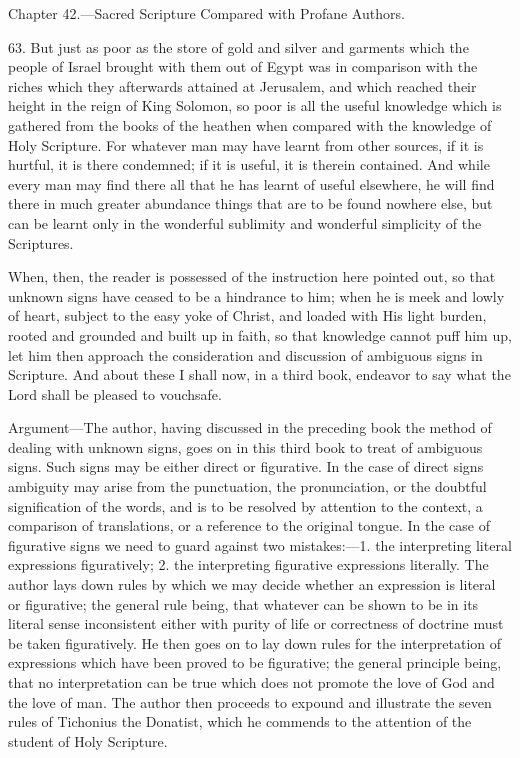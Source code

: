 
Chapter 42.—Sacred Scripture Compared with Profane Authors.

63. But just as poor as the store of gold and silver and garments which the people of Israel brought with them out of Egypt was in comparison with the riches which they afterwards attained at Jerusalem, and which reached their height in the reign of King Solomon, so poor is all the useful knowledge which is gathered from the books of the heathen when compared with the knowledge of Holy Scripture. For whatever man may have learnt from other sources, if it is hurtful, it is there condemned; if it is useful, it is therein contained. And while every man may find there all that he has learnt of useful elsewhere, he will find there in much greater abundance things that are to be found nowhere else, but can be learnt only in the wonderful sublimity and wonderful simplicity of the Scriptures.

When, then, the reader is possessed of the instruction here pointed out, so that unknown signs have ceased to be a hindrance to him; when he is meek and lowly of heart, subject to the easy yoke of Christ, and loaded with His light burden, rooted and grounded and built up in faith, so that knowledge cannot puff him up, let him then approach the consideration and discussion of ambiguous signs in Scripture. And about these I shall now, in a third book, endeavor to say what the Lord shall be pleased to vouchsafe.


Argument—The author, having discussed in the preceding book the method of dealing with unknown signs, goes on in this third book to treat of ambiguous signs. Such signs may be either direct or figurative. In the case of direct signs ambiguity may arise from the punctuation, the pronunciation, or the doubtful signification of the words, and is to be resolved by attention to the context, a comparison of translations, or a reference to the original tongue. In the case of figurative signs we need to guard against two mistakes:—1. the interpreting literal expressions figuratively; 2. the interpreting figurative expressions literally. The author lays down rules by which we may decide whether an expression is literal or figurative; the general rule being, that whatever can be shown to be in its literal sense inconsistent either with purity of life or correctness of doctrine must be taken figuratively. He then goes on to lay down rules for the interpretation of expressions which have been proved to be figurative; the general principle being, that no interpretation can be true which does not promote the love of God and the love of man. The author then proceeds to expound and illustrate the seven rules of Tichonius the Donatist, which he commends to the attention of the student of Holy Scripture.

